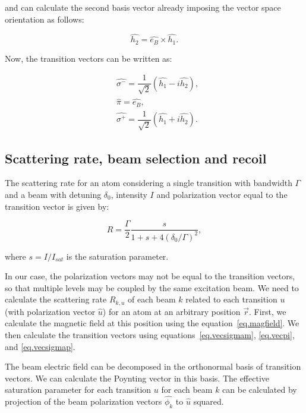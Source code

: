 \documentclass[12pt,a4paper,twoside]{article}
\begin{document}
and can calculate the second basis vector already imposing the vector space orientation as follows:

\begin{equation}
	\hat{h_2} =	\hat{e_B} \times \hat{h_1}.
\end{equation}

Now, the transition vectors can be written as:

\begin{align}
	& \hat{\sigma^{-}} = \dfrac{1}{\sqrt{2}}\left( \hat{h_1} - i \hat{h_2} \right),
	\label{eq.vecsigmam}
	\\
	& \hat{\pi} = \hat{e_B},
	\label{eq.vecpi}	
	\\	
	& \hat{\sigma^{+}} = \dfrac{1}{\sqrt{2}}\left( \hat{h_1} + i \hat{h_2} \right).
	\label{eq.vecsigmap}
\end{align}



\subsection{Scattering rate, beam selection and recoil}

The scattering rate for an atom considering a single transition with bandwidth $\Gamma$ and a beam with detuning $\delta_0$, intensity $I$ and polarization vector equal to the transition vector is given by\cite{foot2005atomic}:

\begin{equation}
	R  = \dfrac{\Gamma}{2}\dfrac{s}{1 + s + 4\left({\delta_0}/{\Gamma}\right)^2},
\end{equation}

\noindent
where $s = I/I_{sat}$ is the saturation parameter.

In our case, the polarization vectors may not be equal to the transition vectors, so that multiple levels may be coupled by the same excitation beam. We need to calculate the scattering rate $R_{k,u}$ of each beam $k$ related to each transition $u$ (with polarization vector $\hat{u}$) for an atom at an arbitrary position $\vec{r}$. First, we calculate the magnetic field at this position using the equation~\ref{eq.magfield}. We then calculate the transition vectors using equations~\ref{eq.vecsigmam}, \ref{eq.vecpi}, and \ref{eq.vecsigmap}.

The beam electric field can be decomposed in the orthonormal basis of transition vectors. We can calculate the Poynting vector in this basis. The effective saturation parameter for each transition $u$ for each beam $k$ can be calculated by projection of the beam polarization vectors $\hat{\phi_k}$ to $\hat{u}$ squared.
\end{document}
